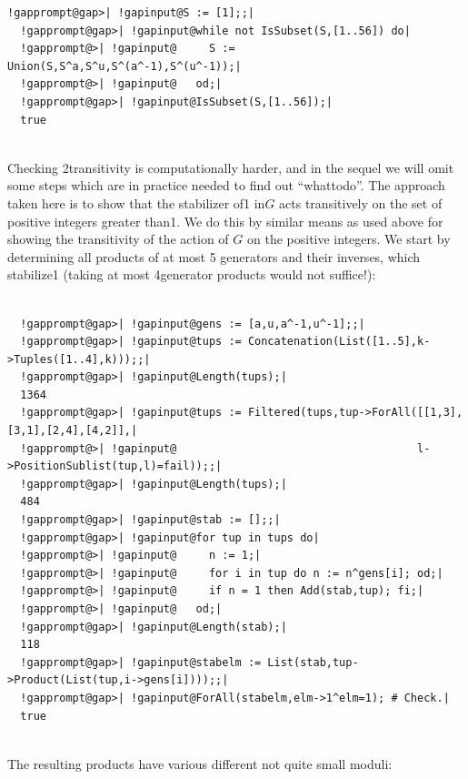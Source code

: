 \documentclass[a4paper,11pt]{report}
\begin{document}
{{\begin{Verbatim}[commandchars=!@|,fontsize=\small,frame=single,label=Example]
  !gapprompt@gap>| !gapinput@S := [1];;|
  !gapprompt@gap>| !gapinput@while not IsSubset(S,[1..56]) do|
  !gapprompt@>| !gapinput@     S := Union(S,S^a,S^u,S^(a^-1),S^(u^-1));|
  !gapprompt@>| !gapinput@   od;|
  !gapprompt@gap>| !gapinput@IsSubset(S,[1..56]);|
  true
  
\end{Verbatim}
 Checking 2\texttt{}transitivity is computationally harder, and in
the sequel we will omit some steps which are in practice needed to find out ``what{\nobreakspace}to{\nobreakspace}do''. The approach taken here is to show that the stabilizer of{\nobreakspace}1
in{\nobreakspace}$G$ acts transitively on the set of positive integers greater
than{\nobreakspace}1. We do this by similar means as used above for showing
the transitivity of the action of $G$ on the positive integers. We start by determining all products of at most 5
generators and their inverses, which stabilize{\nobreakspace}1 (taking at most
4\texttt{}generator products would not suffice!): 
\begin{Verbatim}[commandchars=!@|,fontsize=\small,frame=single,label=Example]
  
  !gapprompt@gap>| !gapinput@gens := [a,u,a^-1,u^-1];;|
  !gapprompt@gap>| !gapinput@tups := Concatenation(List([1..5],k->Tuples([1..4],k)));;|
  !gapprompt@gap>| !gapinput@Length(tups);|
  1364
  !gapprompt@gap>| !gapinput@tups := Filtered(tups,tup->ForAll([[1,3],[3,1],[2,4],[4,2]],|
  !gapprompt@>| !gapinput@                                     l->PositionSublist(tup,l)=fail));;|
  !gapprompt@gap>| !gapinput@Length(tups);|
  484
  !gapprompt@gap>| !gapinput@stab := [];;|
  !gapprompt@gap>| !gapinput@for tup in tups do|
  !gapprompt@>| !gapinput@     n := 1;|
  !gapprompt@>| !gapinput@     for i in tup do n := n^gens[i]; od;|
  !gapprompt@>| !gapinput@     if n = 1 then Add(stab,tup); fi;|
  !gapprompt@>| !gapinput@   od;|
  !gapprompt@gap>| !gapinput@Length(stab);|
  118
  !gapprompt@gap>| !gapinput@stabelm := List(stab,tup->Product(List(tup,i->gens[i])));;|
  !gapprompt@gap>| !gapinput@ForAll(stabelm,elm->1^elm=1); # Check.|
  true
  
\end{Verbatim}
 The resulting products have various different not quite small moduli: 
\begin{Verbatim}[commandchars=!@|,fontsize=\small,frame=single,label=Example]
  

\end{Verbatim}}}
\end{document}
